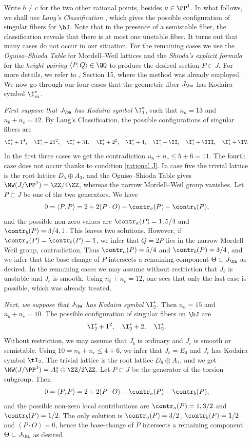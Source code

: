 \iffalse
Write  $b\neq c$ for the two other rational points, besides $a\in\PP^1$.
In what follows, we shall use   \emph{Lang's Classification} \cite{Lang-2000},
which gives the possible  configuration of singular fibers for
$\bJ$. Note that in the presence of a semistable fiber, the classification reveals that there is at most one unstable fiber.
It turns out that many cases do not occur in our situation.
For the remaining cases we use the  \emph{Oguiso--Shioda Table} \cite{Oguiso-Shioda-1991}  for Mordell--Weil lattices
and the \emph{Shioda's explicit formula} \cite{Shioda-1990} for the \emph{height pairing} $\langle P,Q\rangle\in\QQ$  to produce
the desired section $P\subset J$.  For more details, we refer to \cite{Schroeer-2021a}, Section 15,
where the method was already employed. We now go through our four cases that the geometric fiber $J_\ba$ has Kodaira symbol
$\I_m^*$.

\emph{First suppose that $J_\ba$ has Kodaira symbol $\I_1^*$}, such that $n_a=13$ and $n_b+n_c=12$. By Lang's Classification,
the possible configurations of singular fibers are
$$
\I_1^*+1^4,\quad \I^*_1+21^2,\quad \I_1^*+31,\quad \I_1^*+2^2,\quad \I_1^*+4,\quad \I_1^*+\II,\quad\I_1^*+\III,\quad\I_1^*+\IV.
$$
In the first three cases we get the contradiction $n_b+n_c\leq 5+6=11$.
The fourth case does not occur thanks to condition \ref{rational J}.
In case five the trivial lattice is the root lattice $D_5\oplus A_3$, and the Oguiso--Shioda Table gives
$\MW(J/\PP^1)=\ZZ/4\ZZ$, whereas the narrow Mordell--Weil group vanishes. Let $P\subset J$ be one of the two generators.
We have
$$
0=\langle P,P\rangle = 2+2(P\cdot O) -\contr_a(P)-\contr_b(P),
$$
and the possible non-zero values are $\contr_a(P)=1,5/4$ and $\contr_b(P)=3/4,1$.
This leaves two solutions. However, if $\contr_a(P)=\contr_b(P)=1$,
we infer that $Q=2P$ lies in the narrow Mordell--Weil group, contradiction.
Thus $\contr_a(P)=5/4$ and $\contr_b(P)=3/4$, and we infer that the base-change of $P$ intersects
a remaining component $\Theta\subset J_\ba$ as desired.
In the remaining cases we may assume without restriction that $J_b$ is unstable and $J_c$ is smooth.
Using $n_b+n_c=12$, one sees that only the last case is possible, which was already treated.

\emph{Next, we suppose that $J_\ba$ has Kodaira symbol $\I_2^*$.}
Then $n_a=15$ and $n_b+n_c=10$.
The possible configuration of singular fibers
on $\bJ$ are
$$
\I_2^*+1^2,\quad \I_2^*+2,\quad \I_2^*.
$$
Without restriction, we may assume that $J_b$ is ordinary and $J_c$ is smooth or semi\-stable.
Using $10=n_b+n_c\leq 4+6$, we infer that $J_b=E_4$ and $J_c$ has Kodaira symbol $\tI_2$.
The trivial lattice   is the root lattice $D_6\oplus A_1$, and we get
$\MW(J/\PP^1)=A_1^*\oplus\ZZ/2\ZZ$. Let $P\subset J$ be the
generator of the torsion subgroup.
Then
$$
0=\langle P,P\rangle = 2+2(P\cdot O) -\contr_a(P)-\contr_b(P),
$$
and the possible non-zero local contributions are $\contr_a(P)=1,3/2$ and $\contr_b(P)=1/2$.
The only solution is $\contr_a(P)=3/2$, $\contr_b(P)=1/2$ and $(P\cdot O)=0$,
hence the base-change of $P$ intersects a remaining component $\Theta\subset J_\ba$ as desired.

